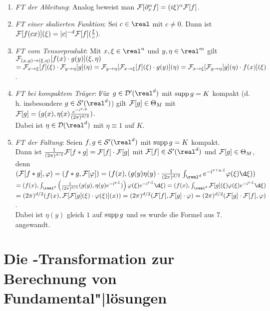 \begin{enumerate}
    \item
    \emph{FT der Ableitung}:
    Analog beweist man $\mathcal{F}[\partial_x^\alpha f] = (i\xi)^\alpha \mathcal{F}[f]$.

    \item
    \emph{FT einer skalierten Funktion}:
    Sei $c \in \real$ mit $c \not= 0$.
    Dann ist $\mathcal{F}[f(cx)](\xi) = |c|^{-d} \mathcal{F}[f](\frac{\xi}{c})$.

    \item
    \emph{FT vom Tensorprodukt}:
    Mit $x, \xi \in \real^n$ und $y, \eta \in \real^m$ gilt
    $\mathcal{F}_{(x, y) \to (\xi, \eta)}[f(x) \cdot g(y)](\xi, \eta)$\\
    $= \mathcal{F}_{x \to \xi}[f](\xi) \cdot \mathcal{F}_{y \to \eta}[g](\eta) =
    \mathcal{F}_{y \to \eta}[\mathcal{F}_{x \to \xi}[f](\xi) \cdot g(y)](\eta) =
    \mathcal{F}_{x \to \xi}[\mathcal{F}_{y \to \eta}[g](\eta) \cdot f(x)](\xi)$.

    \item
    \emph{FT bei kompaktem Träger}:
    Für $g \in \D'(\real^d)$ mit $\operatorname{supp} g = K$ kompakt
    (d.\,h. insbesondere $g \in \S'(\real^d)$) gilt
    $\mathcal{F}[g] \in \Theta_M$ mit
    $\mathcal{F}[g] = (g(x), \eta(x)\frac{e^{-\mathrm{i}\sp{x, y}}}{(2\pi)^{d/2}})$.\\
    Dabei ist $\eta \in \D(\real^d)$ mit $\eta \equiv 1$ auf $K$.

    \item
    \emph{FT der Faltung}:
    Seien $f, g \in \S'(\real^d)$ mit $\operatorname{supp} g = K$ kompakt.\\
    Dann ist $\frac{1}{(2\pi)^{d/2}} \mathcal{F}[f \ast g] = \mathcal{F}[f] \cdot \mathcal{F}[g]$
    mit $\F[f] \in \S'(\real^d)$ und $\mathcal{F}[g] \in \Theta_M$, denn\\
    $(\F[f \ast g], \varphi) = (f \ast g, \F[\varphi]) =
    (f(x), (g(y)\eta(y) \cdot \frac{1}{(2\pi)^{d/2}}
    \int_{\real^d} e^{-\i\sp{x + y, \xi}}\varphi(\xi)\d\xi))$\\
    $= (f(x), \int_{\real^d}
    \left(\frac{1}{(2\pi)^{d/2}} (g(y), \eta(y)e^{-\i\sp{y, \xi}})\right)
    \varphi(\xi)e^{-\i\sp{x, \xi}}\d\xi) =
    (f(x), \int_{\real^d} \F[g](\xi)\varphi(\xi)e^{-\i\sp{x, \xi}}\d\xi)$\\
    $= (2\pi)^{d/2} (f(x), \mathcal{F}[\mathcal{F}[g](\xi) \cdot \varphi(\xi)](x)) =
    (2\pi)^{d/2} (\mathcal{F}[f], \mathcal{F}[g] \cdot \varphi) =
    (2\pi)^{d/2} (\mathcal{F}[g] \cdot \mathcal{F}[f], \varphi)$.\\
    Dabei ist $\eta(y)$ gleich $1$ auf $\operatorname{supp} g$ und es wurde die Formel aus
    7. angewandt.
\end{enumerate}

\section{%
    Die -Transformation zur Berechnung von Fundamental"|lösungen%
}

